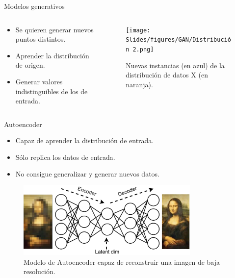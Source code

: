 \begin{frame}{Modelos generativos}
    \begin{columns}[T]
    \begin{column}{.48\textwidth}
    
    \hfill
    \begin{itemize}
        \item Se quieren generar nuevos puntos \alert{distintos}.
        
        \item \alert{Aprender la distribución} de origen.
        
        \item Generar \alert{valores indistinguibles} de los de entrada.
    \end{itemize}
    
    \end{column}
    \hfill
    \begin{column}{.48\textwidth}
    
    \begin{figure}
        \centering
        \texttt{[image: Slides/figures/GAN/Distribución 2.png]}
        \caption{Nuevas instancias (en azul) de la distribución de datos X (en naranja).}
    \end{figure}

    \end{column}
    \end{columns}
\end{frame}

\begin{frame}{Autoencoder}
    
    \hfill
    \begin{itemize}
        \item Capaz de \alert{aprender la distribución} de entrada.
        
        \item Sólo \alert{replica} los datos de entrada.
        
        \item No consigue \alert{generalizar} y generar nuevos datos.
    \end{itemize}
    
    \begin{figure}
        \centering
        \includegraphics[width=0.8\textwidth]{Slides/figures/GAN/Autoencoder.png}
        \caption{Modelo de Autoencoder capaz de reconstruir una imagen de baja resolución.}
    \end{figure}

\end{frame}

